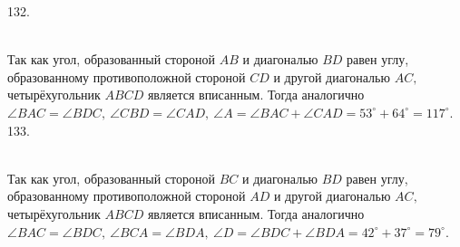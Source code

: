 \documentclass[12pt]{article}
\begin{document}
132. \begin{figure}[ht!]
\end{figure}\\
Так как угол, образованный стороной $AB$ и диагональю $BD$ равен углу, образованному противоположной стороной $CD$ и другой диагональю $AC,$ четырёхугольник $ABCD$ является вписанным. Тогда аналогично $\angle BAC=\angle BDC,\ \angle CBD=\angle CAD,\ \angle A=\angle BAC+\angle CAD=53^\circ+64^\circ=117^\circ.$\\
133. \begin{figure}[ht!]
\end{figure}\\
Так как угол, образованный стороной $BC$ и диагональю $BD$ равен углу, образованному противоположной стороной $AD$ и другой диагональю $AC,$ четырёхугольник $ABCD$ является вписанным. Тогда аналогично $\angle BAC=\angle BDC,\ \angle BCA=\angle BDA,\ \angle D=\angle BDC+\angle BDA=42^\circ+37^\circ=79^\circ.$\\
\end{document}
